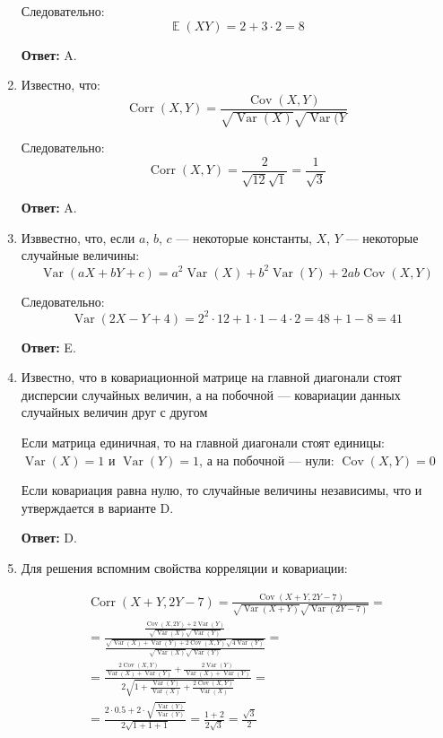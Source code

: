 \documentclass[a4paper]{article} %
\DeclareMathOperator{\Var}{Var}
\DeclareMathOperator{\Cov}{Cov}
\DeclareMathOperator{\Corr}{Corr}
\DeclareMathOperator{\E}{\mathbb{E}}
\begin{document}
\begin{enumerate}
    Следовательно:
    \[
    \E(XY) = 2 + 3\cdot2 = 8
    \]
    
    \textbf{Ответ:} A.
    
    
    \item 
    Известно, что:
    \[
    \Corr(X,Y) = \frac{\Cov(X,Y)}{\sqrt{\Var(X)}\sqrt{\Var(Y}}
    \]
    
    Следовательно:
    \[
    \Corr(X,Y) = \frac{2}{\sqrt{12}\sqrt{1}} = \frac{1}{\sqrt{3}}
    \]
    
    \textbf{Ответ:} A.
    
    
    \item
    Изввестно, что, если $a$, $b$, $c$ — некоторые константы, $X$, $Y$ — некоторые случайные величины:
    \[
    \Var(aX + bY + c) = a^2 \Var(X) + b^2 \Var(Y) + 2ab\Cov(X,Y)
    \]
    
    Следовательно:
    \[
    \Var(2X - Y + 4) = 2^2 \cdot 12 + 1 \cdot 1 - 4 \cdot 2 = 48 + 1 - 8 = 41
    \]
    
    \textbf{Ответ:} E.
    
    
    \item
    Известно, что в ковариационной матрице на главной диагонали стоят дисперсии случайных величин, а на побочной — ковариации данных случайных величин друг с другом
    
    Если матрица единичная, то на главной диагонали стоят единицы: $\Var(X) = 1$ и $\Var(Y) = 1$, а на побочной — нули:  $\Cov(X,Y) = 0$
    
    Если ковариация равна нулю, то случайные величины независимы, что и утверждается в варианте D.
    
    \textbf{Ответ:} D.
    

    \item
    Для решения вспомним свойства корреляции и ковариации:
    
    \begin{align*}
    \Corr(X+Y, 2Y-7) = \frac{\Cov(X+Y, 2Y-7)}{\sqrt{\Var(X+Y)}\sqrt{\Var(2Y-7)}} = \\ 
    =\frac{\frac{\Cov(X, 2Y) + 2 \Var(Y)}{\sqrt{\Var(X)}\sqrt{\Var(Y)}}}{\frac{\sqrt{\Var(X) + \Var(Y) + 2\Cov(X,Y)}\sqrt{4\Var(Y)}}{\sqrt{\Var(X)}\sqrt{\Var(Y)}}} = \\ 
    =\frac{\frac{2\Cov(X, Y)}{\Var(X) + \Var(Y)} + \frac{2 \Var(Y)}{\Var(X) + \Var(Y)}}{2\sqrt{1 + \frac{\Var(Y)}{\Var(X)} + \frac{2\Cov(X,Y)}{\Var(X)}}} = \\ 
    =\frac{2 \cdot 0.5 + 2 \cdot \sqrt{\frac{\Var(Y)}{\Var(Y)}}}{2\sqrt{1 + 1 + 1}} = \frac{1 + 2}{2 \sqrt{3}} = \frac{\sqrt{3}}{2} 
    \end{align*}
    

\end{enumerate}
\end{document}
